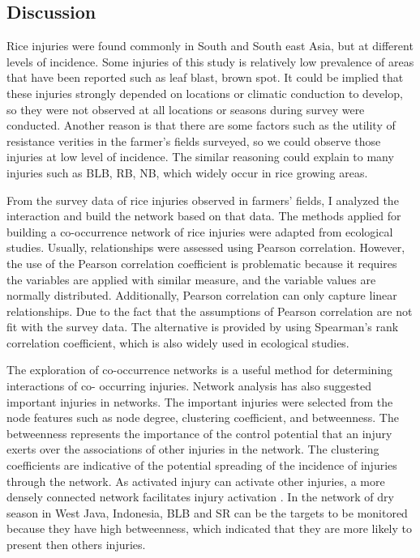 \subsection{Discussion}

Rice injuries were found commonly in South and South east Asia, but at different levels of incidence. 
Some injuries of this study is relatively low prevalence of areas that have been reported such as leaf blast, brown spot. It could be implied that these injuries strongly depended on locations or climatic conduction to develop, so they were not observed at all locations or seasons during survey were conducted. Another reason is that there are some factors such as the utility of resistance verities in the farmer’s fields surveyed, so we could observe those injuries at low level of incidence. The similar reasoning could explain to many injuries such as BLB, RB, NB, which widely occur in rice growing areas.

From the survey data of rice injuries observed in farmers’ fields, I analyzed the interaction and build the network based on that data. The methods applied for building a co-occurrence network of rice injuries were adapted from ecological studies. Usually, relationships were assessed using Pearson correlation. However, the use of the Pearson correlation coefficient is problematic because it requires the variables are applied with similar measure, and the variable values are normally distributed. Additionally, Pearson correlation can only capture linear relationships. Due to the fact that the assumptions of Pearson correlation are not fit with the survey data. The alternative is provided by using Spearman’s rank correlation coefficient, which is also widely used in ecological studies.

The exploration of co-occurrence networks is a useful method for determining interactions of co- occurring injuries. Network analysis has also suggested important injuries in networks. The important injuries were selected from the node features such as node degree, clustering coefficient, and betweenness. The betweenness represents the importance of the control potential that an injury exerts over the associations of other injuries in the network. The clustering coefficients are indicative of the potential spreading of the incidence of injuries through the network. As activated injury can activate other injuries, a more densely connected network facilitates injury activation \cite{Williams_2014_demonstrating}. In the network of dry season in West Java, Indonesia, BLB and SR can be the targets to be monitored because they have high betweenness, which indicated that they are more likely to present then others injuries.

